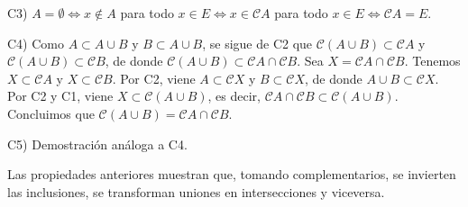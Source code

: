C3) \( A = \emptyset \Leftrightarrow x \notin A \) para todo \( x \in E \Leftrightarrow x \in \mathcal{C}A \) para todo \( x \in E \Leftrightarrow \mathcal{C}A = E \).

C4) Como \( A \subset A \cup B \) y \( B \subset A \cup B \), se sigue de C2 que \( \mathcal{C}(A \cup B) \subset \mathcal{C}A \) y \( \mathcal{C}(A \cup B) \subset \mathcal{C}B \), de donde \( \mathcal{C}(A \cup B) \subset \mathcal{C}A \cap \mathcal{C}B \). Sea \( X = \mathcal{C}A \cap \mathcal{C}B \). Tenemos \( X \subset \mathcal{C}A \) y \( X \subset \mathcal{C}B \). Por C2, viene \( A \subset \mathcal{C}X \) y \( B \subset \mathcal{C}X \), de donde \( A \cup B \subset \mathcal{C}X \). Por C2 y C1, viene \( X \subset \mathcal{C}(A \cup B) \), es decir, \( \mathcal{C}A \cap \mathcal{C}B \subset \mathcal{C}(A \cup B) \). Concluimos que \( \mathcal{C}(A \cup B) = \mathcal{C}A \cap \mathcal{C}B \).

C5) Demostración análoga a C4.

Las propiedades anteriores muestran que, tomando complementarios, se invierten las inclusiones, se transforman uniones en intersecciones y viceversa.

